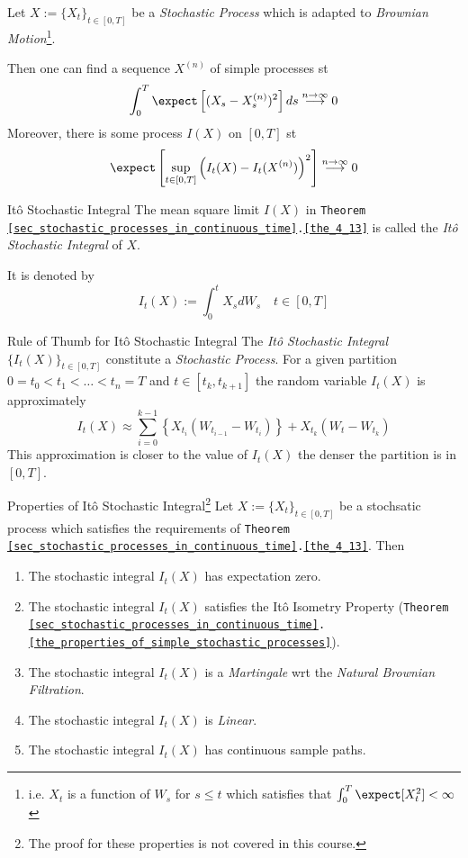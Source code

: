 \documentclass[11pt,a4paper]{article}
\begin{document}
  \begin{theorem}{}\label{the_4_13}
    Let $X:=\{X_t\}_{t\in[0,T]}$ be a \textit{Stochastic Process} which is adapted to \textit{Brownian Motion}\footnote{i.e. $X_t$ is a function of $W_s$ for $s\leq t$ which satisfies that $\int_0^T\expect[X_t^2]<\infty$}.
    \par Then one can find a sequence $X^{(n)}$ of simple processes st
    \[ \int_0^T\expect\left[(X_s-X_s^{(n)})^2\right]ds\overset{n\to\infty}{\longrightarrow}0 \]
    Moreover, there is some process $I(X)$ on $[0,T]$ st
    \[ \expect\left[\sup_{t\in[0,T]}\left(I_t(X)-I_t(X^{(n)})\right)^2\right]\overset{n\to\infty}{\longrightarrow}0 \]
  \end{theorem}

  \begin{definition}{It\^o Stochastic Integral}
    The mean square limit $I(X)$ in \texttt{Theorem \ref{sec_stochastic_processes_in_continuous_time}.\ref{the_4_13}} is called the \textit{It\^o Stochastic Integral} of $X$.
    \par It is denoted by
    \[ I_t(X):=\int_0^tX_sdW_s\quad t\in[0,T] \]
  \end{definition}

  \begin{remark}{Rule of Thumb for It\^o Stochastic Integral}
    The \textit{It\^o Stochastic Integral} $\{I_t(X)\}_{t\in[0,T]}$ constitute a \textit{Stochastic Process}. For a given partition $0=t_0<t_1<\dots<t_n=T$ and $t\in[t_k,t_{k+1}]$ the random variable $I_t(X)$ is approximately
    \[ I_t(X)\approx\sum_{i=0}^{k-1}\left\{X_{t_i}(W_{t_{i-1}}-W_{t_i})\right\}+X_{t_k}(W_t-W_{t_k}) \]
    This approximation is closer to the value of $I_t(X)$ the denser the partition is in $[0,T]$.
  \end{remark}

  \begin{theorem}{Properties of It\^o Stochastic Integral\footnote{The proof for these properties is not covered in this course.}}\label{the_properties_of_ito_stochastic_integral}
    Let $X:=\{X_t\}_{t\in[0,T]}$ be a stochsatic process which satisfies the requirements of \texttt{Theorem \ref{sec_stochastic_processes_in_continuous_time}.\ref{the_4_13}}. Then
    \begin{enumerate}
      \item The stochastic integral $I_t(X)$ has expectation zero.
      \item The stochastic integral $I_t(X)$ satisfies the It\^o Isometry Property (\texttt{Theorem \ref{sec_stochastic_processes_in_continuous_time}.\ref{the_properties_of_simple_stochastic_processes}}).
      \item The stochastic integral $I_t(X)$ is a \textit{Martingale} wrt the \textit{Natural Brownian Filtration}.
      \item The stochastic integral $I_t(X)$ is \textit{Linear}.
      \item The stochastic integral $I_t(X)$ has continuous sample paths.
    \end{enumerate}
  \end{theorem}
\end{document}
